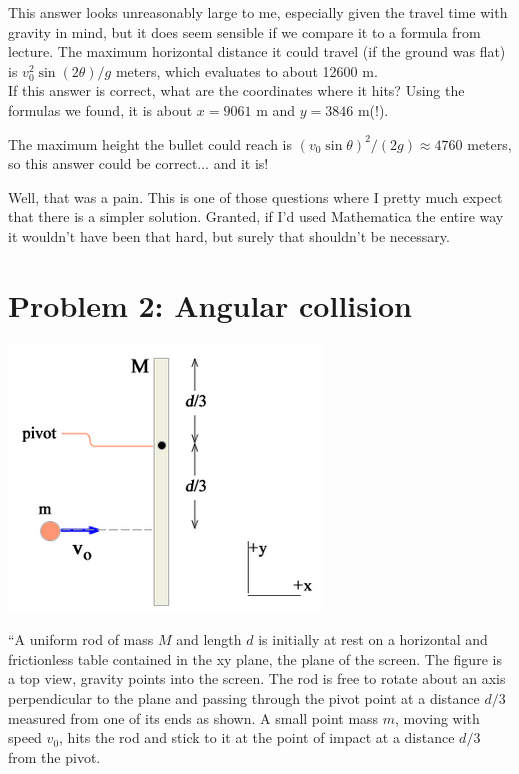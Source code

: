 \documentclass[8.01x]{subfiles}
\begin{document}
This answer looks unreasonably large to me, especially given the travel time with gravity in mind, but it does seem sensible if we compare it to a formula from lecture. The maximum horizontal distance it could travel (if the ground was flat) is $v_0^2 \sin(2\theta) / g$ meters, which evaluates to about 12600 m.\\
If this answer is correct, what are the coordinates where it hits? Using the formulas we found, it is about $x = 9061$ m and $y = 3846$ m(!).

The maximum height the bullet could reach is $(v_0 \sin \theta)^2 / (2g) \approx 4760$ meters, so this answer could be correct... and it is!

Well, that was a pain. This is one of those questions where I pretty much expect that there is a simpler solution. Granted, if I'd used Mathematica the entire way it wouldn't have been that hard, but surely that shouldn't be necessary.

\section{Problem 2: Angular collision}

\begin{center}
\includegraphics[scale=0.65]{Graphics/finalexam_p2}
\end{center}

``A uniform rod of mass $M$ and length $d$ is initially at rest on a horizontal and frictionless table contained in the xy plane, the plane of the screen. The figure is a top view, gravity points into the screen. The rod is free to rotate about an axis perpendicular to the plane and passing through the pivot point at a distance $d/3$ measured from one of its ends as shown. A small point mass $m$, moving with speed $v_0$, hits the rod and stick to it at the point of impact at a distance $d/3$ from the pivot.
\end{document}
